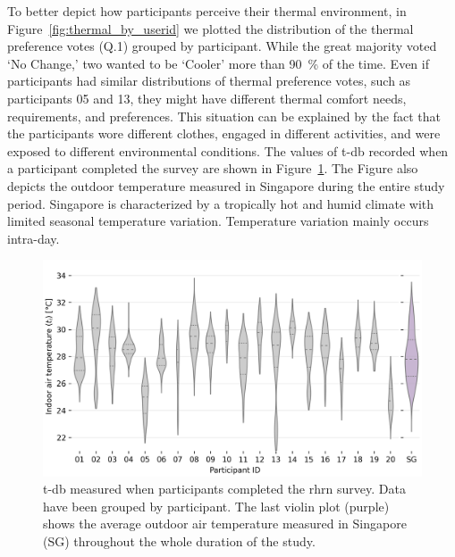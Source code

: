 To better depict how participants perceive their thermal environment, in Figure~\ref{fig:thermal_by_userid} we plotted the distribution of the thermal preference votes (Q.1) grouped by participant.
While the great majority voted `No Change,' two wanted to be `Cooler' more than 90~\% of the time.
Even if participants had similar distributions of thermal preference votes, such as participants 05 and 13, they might have different thermal comfort needs, requirements, and preferences.
This situation can be explained by the fact that the participants wore different clothes, engaged in different activities, and were exposed to different environmental conditions.
The values of \ac{t-db} recorded when a participant completed the survey are shown in Figure~\ref{fig:tmp_env_survey}.
The Figure also depicts the outdoor temperature measured in Singapore during the entire study period.
Singapore is characterized by a tropically hot and humid climate with limited seasonal temperature variation.
Temperature variation mainly occurs intra-day.

 \begin{figure}[thb!]
     \begin{center}
        \includegraphics[width=\linewidth,height=\textheight,keepaspectratio]{figures/figure_6}
     \end{center}
     \caption{\Acf{t-db} measured when participants completed the \ac{rhrn} survey.
     Data have been grouped by participant.
     The last violin plot (purple) shows the average outdoor air temperature measured in Singapore (SG) throughout the whole duration of the study.}\label{fig:tmp_env_survey}
 \end{figure}

